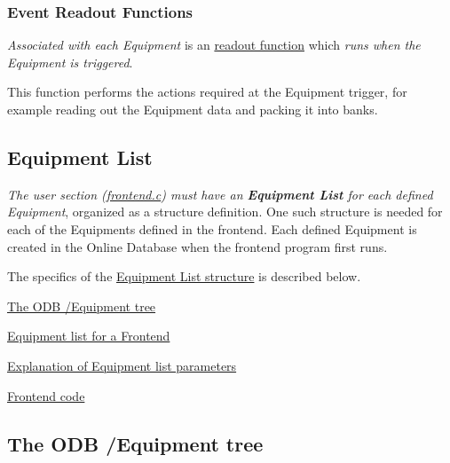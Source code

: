 \label{FrontendOperation_idx_event_readout}
\hypertarget{FrontendOperation_idx_event_readout}{}
 \hypertarget{FrontendOperation_FE_equipment_readout_function}{}\subsubsection{Event Readout Functions}\label{FrontendOperation_FE_equipment_readout_function}
{\itshape Associated with each Equipment \/}is an \hyperlink{FE_eq_event_routines_FE_readout_routine}{readout function} which {\itshape  runs when the Equipment is triggered\/}. \par
This function performs the actions required at the Equipment trigger, for example reading out the Equipment data and packing it into banks.

\label{FrontendOperation_idx_Equipment_list}
\hypertarget{FrontendOperation_idx_Equipment_list}{}
 \hypertarget{FrontendOperation_FE_Equipment_list}{}\subsection{Equipment List}\label{FrontendOperation_FE_Equipment_list}
{\itshape The user section (\hyperlink{frontend_8c}{frontend.c}) must have an {\bfseries Equipment List} for each defined Equipment\/}, organized as a structure definition. One such structure is needed for each of the Equipments defined in the frontend. Each defined Equipment is created in the Online Database when the frontend program first runs.

The specifics of the \hyperlink{FE_eqdec}{Equipment List structure} is described below.


\begin{DoxyItemize}
\item \hyperlink{FE_ODB_equipment_tree}{The ODB /Equipment tree}
\item \hyperlink{FE_eqdec}{Equipment list for a Frontend}
\item \hyperlink{FE_table}{Explanation of Equipment list parameters}
\item \hyperlink{Frontend_code}{Frontend code}
\end{DoxyItemize}

\par
 

\par
 \label{index_end}
\hypertarget{index_end}{}
 \subsection{The ODB /Equipment tree}\label{FE_ODB_equipment_tree}
\par
 \label{FE_ODB_equipment_tree_idx_ODB_tree_equipment}
\hypertarget{FE_ODB_equipment_tree_idx_ODB_tree_equipment}{}
 

